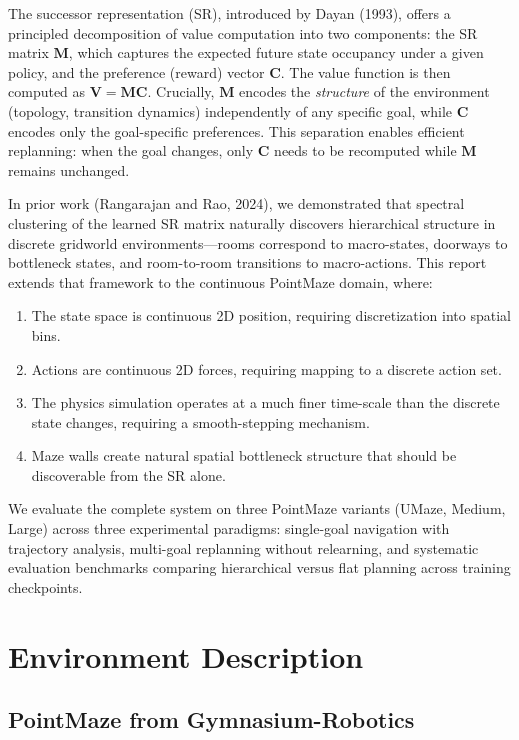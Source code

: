 \documentclass[11pt,a4paper]{article}
\newcommand{\M}{\mathbf{M}}
\newcommand{\C}{\mathbf{C}}
\newcommand{\V}{\mathbf{V}}
\begin{document}
The successor representation (SR), introduced by Dayan (1993), offers a principled decomposition of value computation into two components: the SR matrix $\M$, which captures the expected future state occupancy under a given policy, and the preference (reward) vector $\C$.
The value function is then computed as $\V = \M \C$.
Crucially, $\M$ encodes the \emph{structure} of the environment (topology, transition dynamics) independently of any specific goal, while $\C$ encodes only the goal-specific preferences.
This separation enables efficient replanning: when the goal changes, only $\C$ needs to be recomputed while $\M$ remains unchanged.

In prior work (Rangarajan and Rao, 2024), we demonstrated that spectral clustering of the learned SR matrix naturally discovers hierarchical structure in discrete gridworld environments---rooms correspond to macro-states, doorways to bottleneck states, and room-to-room transitions to macro-actions.
This report extends that framework to the continuous PointMaze domain, where:

\begin{enumerate}[noitemsep]
    \item The state space is continuous 2D position, requiring discretization into spatial bins.
    \item Actions are continuous 2D forces, requiring mapping to a discrete action set.
    \item The physics simulation operates at a much finer time-scale than the discrete state changes, requiring a smooth-stepping mechanism.
    \item Maze walls create natural spatial bottleneck structure that should be discoverable from the SR alone.
\end{enumerate}

We evaluate the complete system on three PointMaze variants (UMaze, Medium, Large) across three experimental paradigms: single-goal navigation with trajectory analysis, multi-goal replanning without relearning, and systematic evaluation benchmarks comparing hierarchical versus flat planning across training checkpoints.

\section{Environment Description}
\label{sec:environment}

\subsection{PointMaze from Gymnasium-Robotics}
\end{document}
